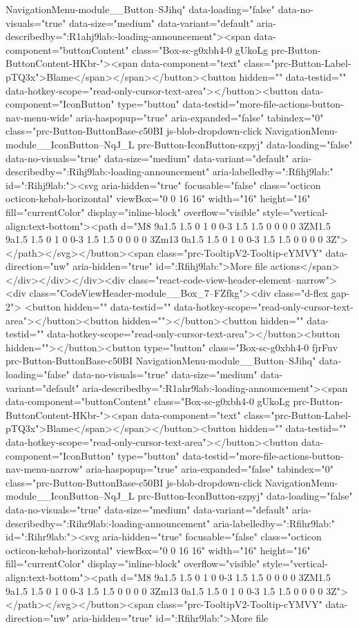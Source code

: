 {{{{{{{{{{{{{{{{{{{{{{{{{{{{{NavigationMenu-module__Button--SJihq" data-loading="false" data-no-visuals="true" data-size="medium" data-variant="default" aria-describedby=":R1ahj9lab:-loading-announcement"><span data-component="buttonContent" class="Box-sc-g0xbh4-0 gUkoLg prc-Button-ButtonContent-HKbr-"><span data-component="text" class="prc-Button-Label-pTQ3x">Blame</span></span></button><button hidden="" data-testid="" data-hotkey-scope="read-only-cursor-text-area"></button><button data-component="IconButton" type="button" data-testid="more-file-actions-button-nav-menu-wide" aria-haspopup="true" aria-expanded="false" tabindex="0" class="prc-Button-ButtonBase-c50BI js-blob-dropdown-click NavigationMenu-module__IconButton--NqJ_L prc-Button-IconButton-szpyj" data-loading="false" data-no-visuals="true" data-size="medium" data-variant="default" aria-describedby=":Rihj9lab:-loading-announcement" aria-labelledby=":Rfihj9lab:" id=":Rihj9lab:"><svg aria-hidden="true" focusable="false" class="octicon octicon-kebab-horizontal" viewBox="0 0 16 16" width="16" height="16" fill="currentColor" display="inline-block" overflow="visible" style="vertical-align:text-bottom"><path d="M8 9a1.5 1.5 0 1 0 0-3 1.5 1.5 0 0 0 0 3ZM1.5 9a1.5 1.5 0 1 0 0-3 1.5 1.5 0 0 0 0 3Zm13 0a1.5 1.5 0 1 0 0-3 1.5 1.5 0 0 0 0 3Z"></path></svg></button><span class="prc-TooltipV2-Tooltip-cYMVY" data-direction="nw" aria-hidden="true" id=":Rfihj9lab:">More file actions</span> </div></div></div><div class="react-code-view-header-element--narrow"><div class="CodeViewHeader-module__Box_7--FZfkg"><div class="d-flex gap-2"> <button hidden="" data-testid="" data-hotkey-scope="read-only-cursor-text-area"></button><button hidden=""></button><button hidden="" data-testid="" data-hotkey-scope="read-only-cursor-text-area"></button><button hidden=""></button><button type="button" class="Box-sc-g0xbh4-0 fjrFuv prc-Button-ButtonBase-c50BI NavigationMenu-module__Button--SJihq" data-loading="false" data-no-visuals="true" data-size="medium" data-variant="default" aria-describedby=":R1ahr9lab:-loading-announcement"><span data-component="buttonContent" class="Box-sc-g0xbh4-0 gUkoLg prc-Button-ButtonContent-HKbr-"><span data-component="text" class="prc-Button-Label-pTQ3x">Blame</span></span></button><button hidden="" data-testid="" data-hotkey-scope="read-only-cursor-text-area"></button><button data-component="IconButton" type="button" data-testid="more-file-actions-button-nav-menu-narrow" aria-haspopup="true" aria-expanded="false" tabindex="0" class="prc-Button-ButtonBase-c50BI js-blob-dropdown-click NavigationMenu-module__IconButton--NqJ_L prc-Button-IconButton-szpyj" data-loading="false" data-no-visuals="true" data-size="medium" data-variant="default" aria-describedby=":Rihr9lab:-loading-announcement" aria-labelledby=":Rfihr9lab:" id=":Rihr9lab:"><svg aria-hidden="true" focusable="false" class="octicon octicon-kebab-horizontal" viewBox="0 0 16 16" width="16" height="16" fill="currentColor" display="inline-block" overflow="visible" style="vertical-align:text-bottom"><path d="M8 9a1.5 1.5 0 1 0 0-3 1.5 1.5 0 0 0 0 3ZM1.5 9a1.5 1.5 0 1 0 0-3 1.5 1.5 0 0 0 0 3Zm13 0a1.5 1.5 0 1 0 0-3 1.5 1.5 0 0 0 0 3Z"></path></svg></button><span class="prc-TooltipV2-Tooltip-cYMVY" data-direction="nw" aria-hidden="true" id=":Rfihr9lab:">More file }}}}}}}}}}}}}}}}}}}}}}}}}}}}}
